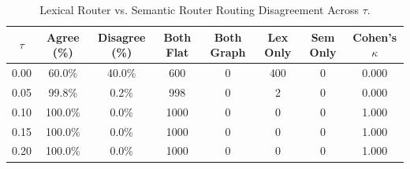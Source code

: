 \begin{table}[t]
\centering
\small
\caption{Lexical Router vs. Semantic Router Routing Disagreement Across $\tau$.}
\label{tab:router_disagreement}
\begin{tabular}{cccccccc}
\toprule
\textbf{$\tau$} & \textbf{Agree (\%)} & \textbf{Disagree (\%)} & \textbf{Both Flat} & \textbf{Both Graph} & \textbf{Lex Only} & \textbf{Sem Only} & \textbf{Cohen's $\kappa$} \\
\midrule
0.00 &  60.0\% &  40.0\% & 600 & 0 & 400 & 0 & 0.000 \\
0.05 &  99.8\% &   0.2\% & 998 & 0 & 2 & 0 & 0.000 \\
0.10 & 100.0\% &   0.0\% & 1000 & 0 & 0 & 0 & 1.000 \\
0.15 & 100.0\% &   0.0\% & 1000 & 0 & 0 & 0 & 1.000 \\
0.20 & 100.0\% &   0.0\% & 1000 & 0 & 0 & 0 & 1.000 \\
\bottomrule
\end{tabular}
\end{table}